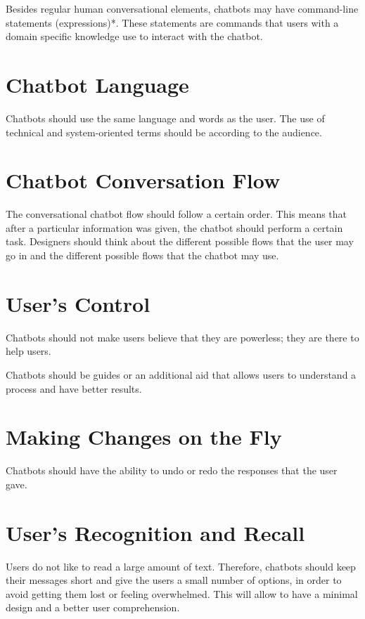 \documentclass[a4paper,10pt]{article}
\begin{document}
 Besides regular human conversational elements, chatbots may have command-line statements (expressions)*. These statements are commands that users with a domain specific knowledge use to interact with the chatbot.
 
 \section{Chatbot Language}
 
 Chatbots should use the same language and words as the user. The use of technical and system-oriented terms should be according to the audience. 

\section{Chatbot Conversation Flow}

The conversational chatbot flow should follow a certain order. This means that after a particular information was given, the chatbot should perform a certain task. Designers should think about the different possible flows that the user may go in and the different possible flows that the chatbot may use.  

\section{User's Control}

Chatbots should not make users believe that they are powerless; they are there to help users.

Chatbots should be guides or an additional aid that allows users to understand a process and have better results.

\section{Making Changes on the Fly}

Chatbots should have the ability to undo or redo the responses that the user gave.

\section{User's Recognition and Recall}

Users do not like to read a large amount of text. Therefore, chatbots should keep their messages short and give the users a small number of options, in order to avoid getting them lost or feeling overwhelmed. This will allow to have a minimal design and a better user comprehension.
\end{document}
